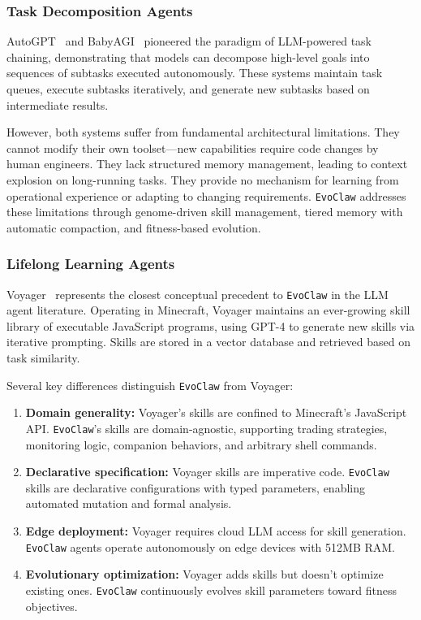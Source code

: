 \documentclass{article}
\newcommand{\evoclaw}{\texttt{EvoClaw}\xspace}
\begin{document}
\subsubsection{Task Decomposition Agents}

AutoGPT~\cite{auto_gpt} and BabyAGI~\cite{babyagi} pioneered the paradigm of LLM-powered task chaining, demonstrating that models can decompose high-level goals into sequences of subtasks executed autonomously. These systems maintain task queues, execute subtasks iteratively, and generate new subtasks based on intermediate results.

However, both systems suffer from fundamental architectural limitations. They cannot modify their own toolset—new capabilities require code changes by human engineers. They lack structured memory management, leading to context explosion on long-running tasks. They provide no mechanism for learning from operational experience or adapting to changing requirements. \evoclaw{} addresses these limitations through genome-driven skill management, tiered memory with automatic compaction, and fitness-based evolution.

\subsubsection{Lifelong Learning Agents}

Voyager~\cite{wang2023voyager} represents the closest conceptual precedent to \evoclaw{} in the LLM agent literature. Operating in Minecraft, Voyager maintains an ever-growing skill library of executable JavaScript programs, using GPT-4 to generate new skills via iterative prompting. Skills are stored in a vector database and retrieved based on task similarity.

Several key differences distinguish \evoclaw{} from Voyager:

\begin{enumerate}[leftmargin=*]
    \item \textbf{Domain generality:} Voyager's skills are confined to Minecraft's JavaScript API. \evoclaw{}'s skills are domain-agnostic, supporting trading strategies, monitoring logic, companion behaviors, and arbitrary shell commands.
    
    \item \textbf{Declarative specification:} Voyager skills are imperative code. \evoclaw{} skills are declarative configurations with typed parameters, enabling automated mutation and formal analysis.
    
    \item \textbf{Edge deployment:} Voyager requires cloud LLM access for skill generation. \evoclaw{} agents operate autonomously on edge devices with 512MB RAM.
    
    \item \textbf{Evolutionary optimization:} Voyager adds skills but doesn't optimize existing ones. \evoclaw{} continuously evolves skill parameters toward fitness objectives.
\end{enumerate}
\end{document}
